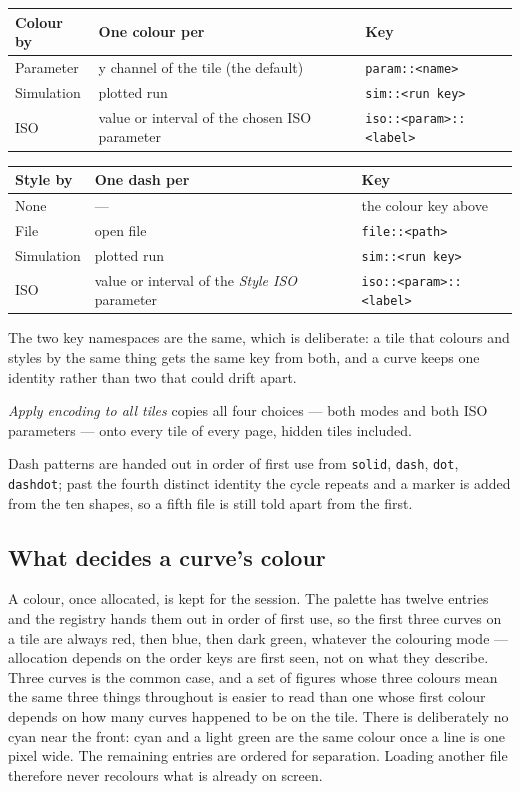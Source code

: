\documentclass[11pt,a4paper,oneside]{report}
\newcommand{\code}[1]{\texttt{#1}}
\begin{document}
\begin{center}
\small
\begin{tabular}{@{}lp{}p{}@{}}
\toprule
\textbf{Colour by} & \textbf{One colour per} & \textbf{Key} \\
\midrule
Parameter & y channel of the tile (the default) & \code{param::<name>} \\
Simulation & plotted run & \code{sim::<run key>} \\
ISO & value or interval of the chosen ISO parameter & \code{iso::<param>::<label>} \\
\bottomrule
\end{tabular}

\vspace{8pt}

\begin{tabular}{@{}lp{}p{}@{}}
\toprule
\textbf{Style by} & \textbf{One dash per} & \textbf{Key} \\
\midrule
None & --- & the colour key above \\
File & open file & \code{file::<path>} \\
Simulation & plotted run & \code{sim::<run key>} \\
ISO & value or interval of the \emph{Style ISO} parameter & \code{iso::<param>::<label>} \\
\bottomrule
\end{tabular}
\end{center}

The two key namespaces are the same, which is deliberate: a tile that colours and
styles by the same thing gets the same key from both, and a curve keeps one
identity rather than two that could drift apart.

\emph{Apply encoding to all tiles} copies all four choices --- both modes and
both ISO parameters --- onto every tile of every page, hidden tiles included.

Dash patterns are handed out in order of first use from \code{solid},
\code{dash}, \code{dot}, \code{dashdot}; past the fourth distinct identity the
cycle repeats and a marker is added from the ten shapes, so a fifth file is
still told apart from the first.

\subsection{What decides a curve's colour}

A colour, once allocated, is kept for the session. The palette has twelve entries
and the registry hands them out in order of first use, so the first three curves
on a tile are always red, then blue, then dark green, whatever the colouring mode
--- allocation depends on the order keys are first seen, not on what they
describe. Three curves is the common case, and a set of figures whose three
colours mean the same three things throughout is easier to read than one whose
first colour depends on how many curves happened to be on the tile. There is
deliberately no cyan near the front: cyan and a light green are the same colour
once a line is one pixel wide. The remaining entries are ordered for separation.
Loading another file therefore never recolours what is already on screen.
\end{document}
